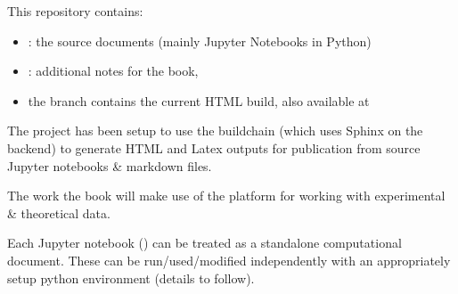 \documentclass[letterpaper,10pt,english]{jupyterBook}
\begin{document}
\sphinxAtStartPar
This repository contains:
\begin{itemize}
\item {} 
\sphinxAtStartPar
{}: the source documents (mainly Jupyter Notebooks in Python)

\item {} 
\sphinxAtStartPar
{}: additional notes for the book,

\item {} 
\sphinxAtStartPar
the  branch contains the current HTML build, also available at 

\end{itemize}

\sphinxAtStartPar
The project has been setup to use the  build\sphinxhyphen{}chain (which uses Sphinx on the back\sphinxhyphen{}end) to generate HTML and Latex outputs for publication from source Jupyter notebooks \& markdown files.

\sphinxAtStartPar
The work  the book will make use of the  platform for working with experimental \& theoretical data.

\sphinxAtStartPar
{}

\begin{DUlineblock}{0em}
\item[] 
\end{DUlineblock}

\sphinxAtStartPar
Each Jupyter notebook () can be treated as a stand\sphinxhyphen{}alone computational document. These can be run/used/modified independently with an appropriately setup python environment (details to follow).

\begin{DUlineblock}{0em}
\item[] 
\end{DUlineblock}
\end{document}
